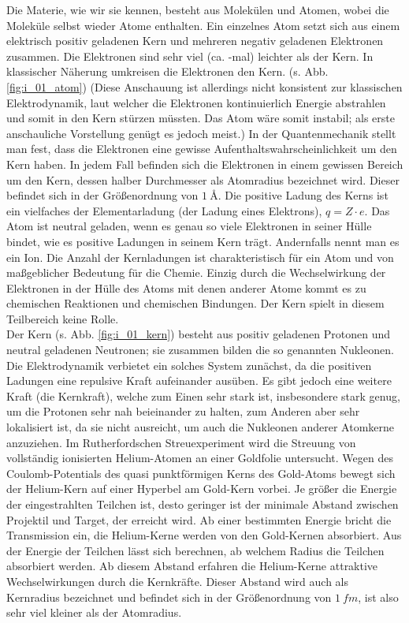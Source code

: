 Die Materie, wie wir sie kennen, besteht aus Molekülen und Atomen, wobei die Moleküle selbst wieder Atome enthalten. Ein einzelnes Atom setzt sich aus einem elektrisch positiv geladenen Kern und mehreren negativ geladenen Elektronen zusammen. Die Elektronen sind sehr viel (ca. -mal) leichter als der Kern. In klassischer Näherung umkreisen die Elektronen den Kern. (s. Abb. \ref{fig:i_01_atom}) (Diese Anschauung ist allerdings nicht konsistent zur klassischen Elektrodynamik, laut welcher die Elektronen kontinuierlich Energie abstrahlen und somit in den Kern stürzen müssten. Das Atom wäre somit instabil; als erste anschauliche Vorstellung genügt es jedoch meist.) In der Quantenmechanik stellt man fest, dass die Elektronen eine gewisse Aufenthaltswahrscheinlichkeit um den Kern haben. In jedem Fall befinden sich die Elektronen in einem gewissen Bereich um den Kern, dessen halber Durchmesser als Atomradius bezeichnet wird. Dieser befindet sich in der Größenordnung von $\SI{1}{\angstrom}$. Die positive Ladung des Kerns ist ein vielfaches der Elementarladung (der Ladung eines Elektrons), $q = Z \cdot e$. Das Atom ist neutral geladen, wenn es genau so viele Elektronen in seiner Hülle bindet, wie es positive Ladungen in seinem Kern trägt. Andernfalls nennt man es ein Ion. Die Anzahl der Kernladungen ist charakteristisch für ein Atom und von maßgeblicher Bedeutung für die Chemie. Einzig durch die Wechselwirkung der Elektronen in der Hülle des Atoms mit denen anderer Atome kommt es zu chemischen Reaktionen und chemischen Bindungen. Der Kern spielt in diesem Teilbereich keine Rolle.\\
Der Kern (s. Abb. \ref{fig:i_01_kern}) besteht aus positiv geladenen Protonen und neutral geladenen Neutronen; sie zusammen bilden die so genannten Nukleonen. Die Elektrodynamik verbietet ein solches System zunächst, da die positiven Ladungen eine repulsive Kraft aufeinander ausüben. Es gibt jedoch eine weitere Kraft (die Kernkraft), welche zum Einen sehr stark ist, insbesondere stark genug, um die Protonen sehr nah beieinander zu halten, zum Anderen aber sehr lokalisiert ist, da sie nicht ausreicht, um auch die Nukleonen anderer Atomkerne anzuziehen. Im Rutherfordschen Streuexperiment wird die Streuung von vollständig ionisierten Helium-Atomen an einer Goldfolie untersucht. Wegen des Coulomb-Potentials des quasi punktförmigen Kerns des Gold-Atoms bewegt sich der Helium-Kern auf einer Hyperbel am Gold-Kern vorbei. Je größer die Energie der eingestrahlten Teilchen ist, desto geringer ist der minimale Abstand zwischen Projektil und Target, der erreicht wird. Ab einer bestimmten Energie bricht die Transmission ein, die Helium-Kerne werden von den Gold-Kernen absorbiert. Aus der Energie der Teilchen lässt sich berechnen, ab welchem Radius die Teilchen absorbiert werden. Ab diesem Abstand erfahren die Helium-Kerne attraktive Wechselwirkungen durch die Kernkräfte. Dieser Abstand wird auch als Kernradius bezeichnet und befindet sich in der Größenordnung von $\SI{1}{fm}$, ist also sehr viel kleiner als der Atomradius. \cite{HW03}\\
